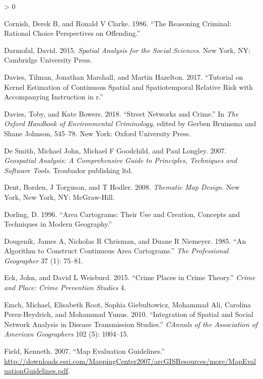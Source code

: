 \documentclass[
  krantz2]{krantz}
\newlength{\cslhangindent}
\newenvironment{CSLReferences}[2] %
 {%
  \setlength{\parindent}{0pt}
  \ifodd #1 \everypar{\setlength{\hangindent}{\cslhangindent}}\ignorespaces\fi
  \ifnum #2 > 0
  \setlength{\parskip}{#2\baselineskip}
  \fi
 }%
 {}
\begin{document}
\begin{CSLReferences}{1}{0}
\leavevmode\hypertarget{ref-Cornish_1986}{}%
Cornish, Derek B, and Ronald V Clarke. 1986. {``The Reasoning Criminal: Rational Choice Perspectives on Offending.''}

\leavevmode\hypertarget{ref-Darmofal_2015}{}%
Darmofal, David. 2015. \emph{Spatial Analysis for the Social Sciences}. New York, NY: Cambridge University Press.

\leavevmode\hypertarget{ref-Davies_2017}{}%
Davies, Tilman, Jonathan Marshall, and Martin Hazelton. 2017. {``Tutorial on Kernel Estimation of Continuous Spatial and Spatiotemporal Relative Risk with Accompanying Instruction in r.''}

\leavevmode\hypertarget{ref-Davies_2018}{}%
Davies, Toby, and Kate Bowers. 2018. {``Street Networks and Crime.''} In \emph{The Oxford Handbook of Environmental Criminology}, edited by Gerben Bruinsma and Shane Johnson, 545--78. New York: Oxford University Press.

\leavevmode\hypertarget{ref-DeSmith_2007}{}%
De Smith, Michael John, Michael F Goodchild, and Paul Longley. 2007. \emph{Geospatial Analysis: A Comprehensive Guide to Principles, Techniques and Software Tools}. Troubador publishing ltd.

\leavevmode\hypertarget{ref-Dent_2008}{}%
Dent, Borden, J Torguson, and T Hodler. 2008. \emph{Thematic Map Design}. New York, New York, NY: McGraw-Hill.

\leavevmode\hypertarget{ref-Dorling_1996}{}%
Dorling, D. 1996. {``Area Cartograms: Their Use and Creation, Concepts and Techniques in Modern Geography.''}

\leavevmode\hypertarget{ref-Dougenik_1985}{}%
Dougenik, James A, Nicholas R Chrisman, and Duane R Niemeyer. 1985. {``An Algorithm to Construct Continuous Area Cartograms.''} \emph{The Professional Geographer} 37 (1): 75--81.

\leavevmode\hypertarget{ref-Eck_2015}{}%
Eck, John, and David L Weisburd. 2015. {``Crime Places in Crime Theory.''} \emph{Crime and Place: Crime Prevention Studies} 4.

\leavevmode\hypertarget{ref-Emch_2010}{}%
Emch, Michael, Elisabeth Root, Sophia Giebultowicz, Mohammad Ali, Carolina Perez-Heydrich, and Mohammad Yunus. 2010. {``Integration of Spatial and Social Network Analysis in Disease Transmission Studies.''} \emph{CAnnals of the Association of American Geographers} 102 (5): 1004--15.

\leavevmode\hypertarget{ref-Field_2007}{}%
Field, Kenneth. 2007. {``Map Evaluation Guidelines.''} \url{http://downloads.esri.com/MappingCenter2007/arcGISResources/more/MapEvaluationGuidelines.pdf}.


\end{CSLReferences}
\end{document}
